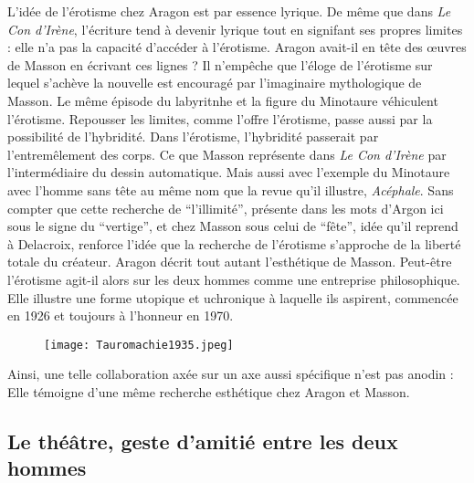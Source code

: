 L'idée de l'érotisme chez Aragon est par essence lyrique. De même que dans \emph{Le Con d'Irène}, l'écriture tend à devenir lyrique tout en signifant ses propres limites : elle n'a pas la capacité d'accéder à l'érotisme. Aragon avait-il en tête des \oe{}uvres de Masson en écrivant ces lignes ? Il n'empêche que l'éloge de l'érotisme sur lequel s'achève la nouvelle est encouragé par l'imaginaire mythologique de Masson. Le même épisode du labyritnhe et la figure du Minotaure véhiculent l'érotisme. Repousser les limites, comme l'offre l'érotisme, passe aussi par la possibilité de l'hybridité. Dans l'érotisme, l'hybridité passerait par l'entremêlement des corps. Ce que Masson représente dans \emph{Le Con d'Irène} par l'intermédiaire du dessin automatique. Mais aussi avec l'exemple du Minotaure avec l'homme sans tête au même nom que la revue qu'il illustre, \emph{Acéphale}. Sans compter que cette recherche de \enquote{l'illimité}, présente dans les mots d'Argon ici sous le signe du \enquote{vertige}, et chez Masson sous celui de \enquote{fête}, idée qu'il reprend à Delacroix, renforce l'idée que la recherche de l'érotisme s'approche de la liberté totale du créateur. Aragon décrit tout autant l'esthétique de Masson. Peut-être l'érotisme agit-il alors sur les deux hommes comme une entreprise philosophique. Elle illustre une forme utopique et uchronique à laquelle ils aspirent, commencée en 1926 et toujours à l'honneur en 1970. 


\begin{figure}[H]
   \centering
   \texttt{[image: Tauromachie1935.jpeg]}
	\caption{\cite{noel}}\label{fig:Tauromachie1935}
\end{figure}


	Ainsi, une telle collaboration axée sur un axe aussi spécifique n’est pas anodin : Elle témoigne d’une même recherche esthétique chez Aragon et Masson. 
\subsection{Le théâtre, geste d'amitié entre les deux hommes}

